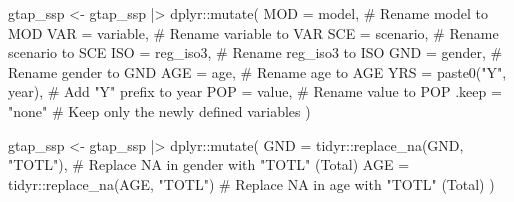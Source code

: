 \documentclass[
  letterpaper,
  DIV=11,
  numbers=noendperiod]{scrartcl}
\newenvironment{Shaded}{}{}
\newcommand{\AttributeTok}[1]{\textcolor[rgb]{0.00,0.34,0.68}{#1}}
\newcommand{\CommentTok}[1]{\textcolor[rgb]{0.54,0.53,0.53}{#1}}
\newcommand{\FunctionTok}[1]{\textcolor[rgb]{0.39,0.29,0.61}{#1}}
\newcommand{\NormalTok}[1]{\textcolor[rgb]{0.12,0.11,0.11}{#1}}
\newcommand{\OtherTok}[1]{\textcolor[rgb]{0.00,0.43,0.16}{#1}}
\newcommand{\SpecialCharTok}[1]{\textcolor[rgb]{0.24,0.68,0.91}{#1}}
\newcommand{\StringTok}[1]{\textcolor[rgb]{0.75,0.01,0.01}{#1}}
\begin{document}
\begin{Shaded}
\begin{Highlighting}[]
\NormalTok{gtap\_ssp }\OtherTok{\textless{}{-}} 
\NormalTok{  gtap\_ssp }\SpecialCharTok{|\textgreater{}}
\NormalTok{  dplyr}\SpecialCharTok{::}\FunctionTok{mutate}\NormalTok{(}
    \AttributeTok{MOD =}\NormalTok{ model,                  }\CommentTok{\# Rename \textquotesingle{}model\textquotesingle{} to \textquotesingle{}MOD\textquotesingle{}}
    \AttributeTok{VAR =}\NormalTok{ variable,               }\CommentTok{\# Rename \textquotesingle{}variable\textquotesingle{} to \textquotesingle{}VAR\textquotesingle{}}
    \AttributeTok{SCE =}\NormalTok{ scenario,               }\CommentTok{\# Rename \textquotesingle{}scenario\textquotesingle{} to \textquotesingle{}SCE\textquotesingle{}}
    \AttributeTok{ISO =}\NormalTok{ reg\_iso3,               }\CommentTok{\# Rename \textquotesingle{}reg\_iso3\textquotesingle{} to \textquotesingle{}ISO\textquotesingle{}}
    \AttributeTok{GND =}\NormalTok{ gender,                 }\CommentTok{\# Rename \textquotesingle{}gender\textquotesingle{} to \textquotesingle{}GND\textquotesingle{}}
    \AttributeTok{AGE =}\NormalTok{ age,                    }\CommentTok{\# Rename \textquotesingle{}age\textquotesingle{} to \textquotesingle{}AGE\textquotesingle{}}
    \AttributeTok{YRS =} \FunctionTok{paste0}\NormalTok{(}\StringTok{"Y"}\NormalTok{, year),      }\CommentTok{\# Add "Y" prefix to \textquotesingle{}year\textquotesingle{}}
    \AttributeTok{POP =}\NormalTok{ value,                  }\CommentTok{\# Rename \textquotesingle{}value\textquotesingle{} to \textquotesingle{}POP\textquotesingle{}}
    \AttributeTok{.keep =} \StringTok{"none"}                \CommentTok{\# Keep only the newly defined variables}
\NormalTok{  )}

\NormalTok{gtap\_ssp }\OtherTok{\textless{}{-}} 
\NormalTok{  gtap\_ssp }\SpecialCharTok{|\textgreater{}}
\NormalTok{  dplyr}\SpecialCharTok{::}\FunctionTok{mutate}\NormalTok{(}
    \AttributeTok{GND =}\NormalTok{ tidyr}\SpecialCharTok{::}\FunctionTok{replace\_na}\NormalTok{(GND, }\StringTok{"TOTL"}\NormalTok{), }\CommentTok{\# Replace NA in gender with "TOTL" (Total)}
    \AttributeTok{AGE =}\NormalTok{ tidyr}\SpecialCharTok{::}\FunctionTok{replace\_na}\NormalTok{(AGE, }\StringTok{"TOTL"}\NormalTok{) }\CommentTok{\# Replace NA in age with "TOTL" (Total)}
\NormalTok{  )}


\end{Highlighting}
\end{Shaded}
\end{document}
